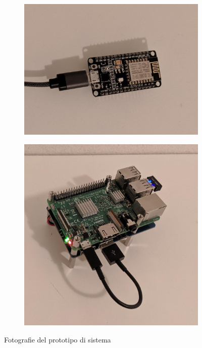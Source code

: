 \begin{figure}[H]
  \centering
  \begin{subfigure}[htbp]{0.45\textwidth}
    \centering
    \includegraphics[width=\textwidth]{res/fig/esp.jpg}%
    \label{subfig:esp}
  \end{subfigure}
  \hfill
  \begin{subfigure}[htbp]{0.45\textwidth}
    \centering
    \includegraphics[width=\textwidth]{res/fig/rpi.jpg}%
    \label{subfig:raspi}
  \end{subfigure}
  \caption{Fotografie del prototipo di sistema}%
  \label{fig:hw}
\end{figure}

